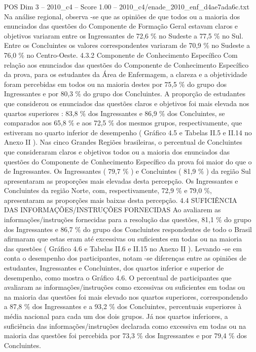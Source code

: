 \begin{textsample}{POS Dim 3 – 2010\_c4 – Score 1.00 – 2010\_c4/enade\_2010\_enf\_d4ae7ada6c.txt}
Na análise regional, observa -se que as opiniões de que todos ou a maioria dos enunciados das questões do Componente de Formação Geral estavam claros e objetivos variaram entre os Ingressantes de 72,6 \% no Sudeste a 77,5 \% no Sul.
Entre os Concluintes os valores correspondentes variaram de 70,9 \% no Sudeste a 76,0 \% no Centro-Oeste. 4.3.2 Componente de Conhecimento Específico Com relação aos enunciados das questões do Componente de Conhecimento Específico da prova, para os estudantes da Área de Enfermagem, a clareza e a objetividade foram percebidas em todos ou na maioria destes por 75,5 \% do grupo dos Ingressantes e por 80,3 \% do grupo dos Concluintes.
A proporção de estudantes que considerou os enunciados das questões claros e objetivos foi mais elevada nos quartos superiores : 83,8 \% dos Ingressantes e 86,9 \% dos Concluintes, se comparados aos 65,8 \% e aos 72,5 \% dos mesmos grupos, respectivamente, que estiveram no quarto inferior de desempenho ( Gráfico 4.5 e Tabelas II.5 e II.14 no Anexo II ).
Nas cinco Grandes Regiões brasileiras, o percentual de Concluintes que consideraram claros e objetivos todos ou a maioria dos enunciados das questões do Componente de Conhecimento Específico da prova foi maior do que o de Ingressantes.
Os Ingressantes ( 79,7 \% ) e Concluintes ( 81,9 \% ) da região Sul apresentaram as proporções mais elevadas desta percepção.
Os Ingressantes e Concluintes da região Norte, com, respectivamente, 72,9 \% e 79,0 \%, apresentaram as proporções mais baixas desta percepção. 4.4 SUFICIÊNCIA DAS INFORMAÇÕES/INSTRUÇÕES FORNECIDAS Ao avaliarem as informações/instruções fornecidas para a resolução das questões, 81,1 \% do grupo dos Ingressantes e 86,7 \% do grupo dos Concluintes respondentes de todo o Brasil afirmaram que estas eram até excessivas ou suficientes em todas ou na maioria das questões ( Gráfico 4.6 e Tabelas II.6 e II.15 no Anexo II ).
Levando -se em conta o desempenho dos participantes, notam -se diferenças entre as opiniões de estudantes, Ingressantes e Concluintes, dos quartos inferior e superior de desempenho, como mostra o Gráfico 4.6.
O percentual de participantes que avaliaram as informações/instruções como excessivas ou suficientes em todas ou na maioria das questões foi mais elevado nos quartos superiores, correspondendo a 87,8 \% dos Ingressantes e a 93,2 \% dos Concluintes, percentuais superiores à média nacional para cada um dos dois grupos.
Já nos quartos inferiores, a suficiência das informações/instruções declarada como excessiva em todas ou na maioria das questões foi percebida por 73,3 \% dos Ingressantes e por 79,4 \% dos Concluintes.

\end{textsample}
